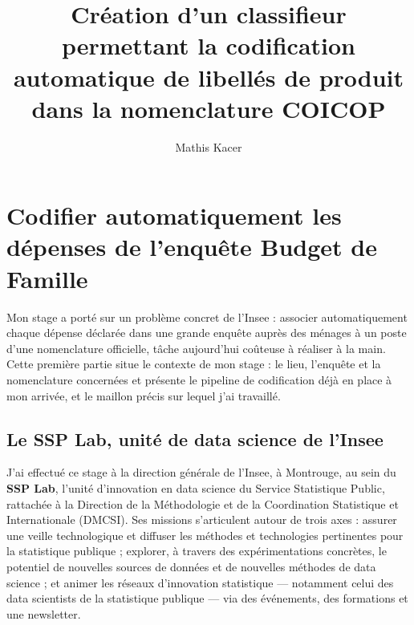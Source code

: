 \documentclass[
]{rapportCS}
\title{Création d'un classifieur permettant la codification automatique
de libellés de produit dans la nomenclature COICOP}
\author{Mathis Kacer}
\date{}
\renewcommand{\maketitle}{}
\renewcommand*\contentsname{Table of contents}
\newcommand\contentsname{Table of contents}
\renewcommand*\listfigurename{List of Figures}
\newcommand\listfigurename{List of Figures}
\renewcommand*\listtablename{List of Tables}
\newcommand\listtablename{List of Tables}
\renewcommand*\figurename{Figure}
\newcommand\figurename{Figure}
\renewcommand*\tablename{Table}
\newcommand\tablename{Table}
\begin{document}
\maketitle

\renewcommand{\contentsname}{Table des matières}
\renewcommand{\listfigurename}{Table des figures}
\renewcommand{\listtablename}{Liste des tableaux}
\renewcommand{\figurename}{Figure}
\renewcommand{\tablename}{Tableau}

\fairecouverture
{}
\tabledematieres


\section{Codifier automatiquement les dépenses de l'enquête Budget de
Famille}\label{codifier-automatiquement-les-duxe9penses-de-lenquuxeate-budget-de-famille}

Mon stage a porté sur un problème concret de l'Insee : associer
automatiquement chaque dépense déclarée dans une grande enquête auprès
des ménages à un poste d'une nomenclature officielle, tâche aujourd'hui
coûteuse à réaliser à la main. Cette première partie situe le contexte
de mon stage : le lieu, l'enquête et la nomenclature concernées et
présente le pipeline de codification déjà en place à mon arrivée, et le
maillon précis sur lequel j'ai travaillé.

\subsection{Le SSP Lab, unité de data science de
l'Insee}\label{le-ssp-lab-unituxe9-de-data-science-de-linsee}

J'ai effectué ce stage à la direction générale de l'Insee, à Montrouge,
au sein du \textbf{SSP Lab}, l'unité d'innovation en data science du
Service Statistique Public, rattachée à la Direction de la Méthodologie
et de la Coordination Statistique et Internationale (DMCSI). Ses
missions s'articulent autour de trois axes : assurer une veille
technologique et diffuser les méthodes et technologies pertinentes pour
la statistique publique ; explorer, à travers des expérimentations
concrètes, le potentiel de nouvelles sources de données et de nouvelles
méthodes de data science ; et animer les réseaux d'innovation
statistique --- notamment celui des data scientists de la statistique
publique --- via des événements, des formations et une newsletter.
\end{document}
